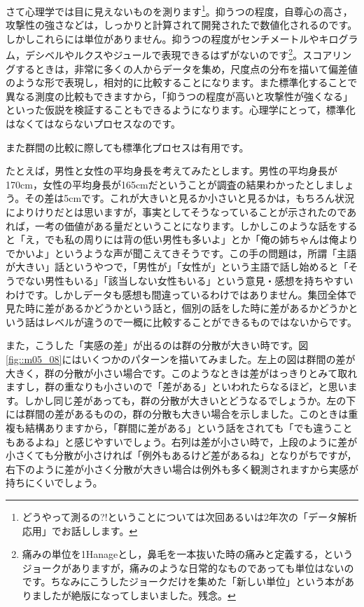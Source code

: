 \documentclass{ltjbook}
\begin{document}
さて心理学では目に見えないものを測ります\footnote{どうやって測るの?!ということについては次回あるいは2年次の「データ解析応用」でお話しします。}。抑うつの程度，自尊心の高さ，攻撃性の強さなどは，しっかりと計算されて開発されたで数値化されるのです。しかしこれらには単位がありません。抑うつの程度がセンチメートルやキログラム，デシベルやルクスやジュールで表現できるはずがないのです\footnote{痛みの単位を1Hanageとし，鼻毛を一本抜いた時の痛みと定義する，というジョークがありますが，痛みのような日常的なものであっても単位はないのです。ちなみにこうしたジョークだけを集めた「新しい単位」\parencite{Hanage2017}という本がありましたが絶版になってしまいました。残念。}。スコアリングするときは，非常に多くの人からデータを集め，尺度点の分布を描いて偏差値のような形で表現し，相対的に比較することになります。また標準化することで異なる測度の比較もできますから，「抑うつの程度が高いと攻撃性が強くなる」といった仮説を検証することもできるようになります。心理学にとって，標準化はなくてはならないプロセスなのです。

また群間の比較に際しても標準化プロセスは有用です。

たとえば，男性と女性の平均身長を考えてみたとします。男性の平均身長が170cm，女性の平均身長が165cmだということが調査の結果わかったとしましょう。その差は5cmです。これが大きいと見るか小さいと見るかは，もちろん状況によりけりだとは思いますが，事実としてそうなっていることが示されたのであれば，一考の価値がある量だということになります。しかしこのような話をすると「え，でも私の周りには背の低い男性も多いよ」とか「俺の姉ちゃんは俺よりでかいよ」というような声が聞こえてきそうです。この手の問題は，所謂「主語が大きい」話というやつで，「男性が」「女性が」という主語で話し始めると「そうでない男性もいる」「該当しない女性もいる」という意見・感想を持ちやすいわけです。しかしデータも感想も間違っているわけではありません。集団全体で見た時に差があるかどうかという話と，個別の話をした時に差があるかどうかという話はレベルが違うので一概に比較することができるものではないからです。

また，こうした「実感の差」が出るのは群の分散が大きい時です。図\ref{fig::m05_08}にはいくつかのパターンを描いてみました。左上の図は群間の差が大きく，群の分散が小さい場合です。このようなときは差がはっきりとみて取れますし，群の重なりも小さいので「差がある」といわれたらなるほど，と思います。しかし同じ差があっても，群の分散が大きいとどうなるでしょうか。左の下には群間の差があるものの，群の分散も大きい場合を示しました。このときは重複も結構ありますから，「群間に差がある」という話をされても「でも違うこともあるよね」と感じやすいでしょう。右列は差が小さい時で，上段のように差が小さくても分散が小さければ「例外もあるけど差があるね」となりがちですが，右下のように差が小さく分散が大きい場合は例外も多く観測されますから実感が持ちにくいでしょう。
\end{document}
